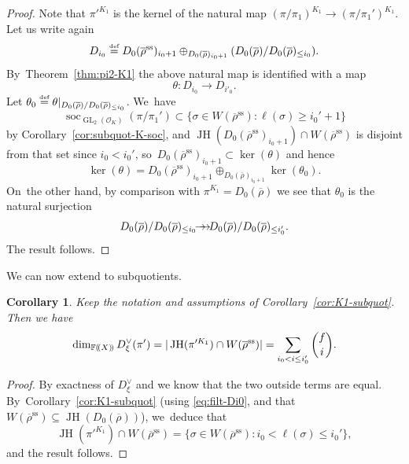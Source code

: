 \documentclass[JEP,XML,SOM,Unicode,NoFloatCountersInSection, NoEqCountersInSection,published]{cedram}
\newcommand{\onto}{\mathchoice{\to\hspace*{-5mm}\to}{\mathrel{\hbox{$\to\hspace*{-2.85mm}\to$}}}{\to\hspace*{-3mm}\to}{\to\hspace*{-3mm}\to}}
\newcommand{\defeq}{\stackrel{\textrm{\tiny{\upshape{def}}}}{=}}
\newcommand{\F}{\mathbb{F}}
\newcommand{\cO}{\mathcal{O}}
\renewcommand{\ss}{\mathrm{ss}}
\newcommand{\rhobar}{\overline{\rho}}
\newcommand{\brho}{\overline{\rho}}
\newcommand{\ppar}[1]{(\mkern-3mu(#1)\mkern-3mu)}
\DeclareMathOperator{\GL}{GL}
\DeclareMathOperator{\JH}{\mathrm{JH}}
\DeclareMathOperator{\soc}{soc}
\theoremstyle{plain}
\newtheorem{cor}[prop]{Corollary}
\theoremstyle{definition}
\begin{document}
\begin{proof}
Note that $\pi'^{K_1}$ is the kernel of the natural map $(\pi/\pi_1)^{K_1} \to (\pi/\pi_1')^{K_1}$.
Let us write again\vspace*{-3pt}
\[
D_{i_0} \defeq D_0(\brho^\ss)_{i_0+1} \oplus_{D_0(\brho)_{i_0+1}} (D_0(\brho)/D_0(\brho)_{\le i_0}).
\]
By~Theorem~\ref{thm:pi2-K1} the above natural map is identified with a map
\begin{equation*}
\theta: D_{i_0} \to D_{i'_0}.
\end{equation*}
Let $\theta_0 \defeq \theta|_{D_0(\brho)/D_0(\brho)_{\le i_0}}$. We~have\vspace*{-3pt}
\[
\soc_{\GL_2(\cO_K)}(\pi/\pi_1') \subset \{ \sigma \in W(\brho^\ss): \ell(\sigma) \ge i_0'+1 \}
\]
by Corollary~\ref{cor:subquot-K-soc}, and $\JH(D_0(\brho^\ss)_{i_0+1}) \cap W(\brho^\ss)$ is disjoint from that set since $i_0 < i_0'$, so~$D_0(\brho^\ss)_{i_0+1} \subset \ker(\theta)$ and hence\vspace*{-3pt}
\[
\ker(\theta) = D_0(\brho^\ss)_{i_0+1} \oplus_{D_0(\brho)_{i_0+1}} \ker(\theta_0).
\]
On~the other hand, by comparison with $\pi^{K_1} = D_0(\brho)$ we see that $\theta_0$ is the natural surjection\vspace*{-3pt}
\[
D_0(\brho)/D_0(\brho)_{\le i_0} \onto D_0(\brho)/D_0(\brho)_{\le i'_0}.
\]
The result follows.
\end{proof}

We can now extend \cite[Th.\,1.2]{YitongWang} to subquotients.

\begin{cor}\label{cor:yitong-subquot}
Keep the notation and assumptions of Corollary~\ref{cor:K1-subquot}. Then we have\vspace*{-3pt}
\begin{equation*}
\dim_{\F\ppar{X}} D_{\xi}^{\vee}(\pi')=|\JH(\pi'^{K_1}) \cap W(\rhobar^\ss)|=\sum_{i_0 < i \le i_0'} \binom fi.
\end{equation*}
\end{cor}

\begin{proof}
By exactness of $D_{\xi}^{\vee}$ and \cite[Cor.\,4.4.2]{BHHMS4} we know that the two outside terms are equal. By~Corollary~\ref{cor:K1-subquot} (using \eqref{eq:filt-Di0}, \cite[Eq.\,(67)]{BHHMS4} and that $W(\rhobar^\ss)\subseteq \JH(D_0(\brho))$), we~deduce that\vspace*{-3pt}
\[
\JH(\pi'^{K_1}) \cap W(\rhobar^\ss) = \{ \sigma \in W(\brho^\ss): i_0 < \ell(\sigma) \le i_0' \},
\]
and the result follows.
\end{proof}
\end{document}
